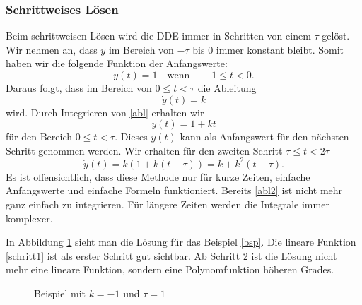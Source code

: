 \subsubsection{Schrittweises Lösen}
Beim schrittweisen Lösen wird die DDE immer in Schritten von einem $\tau$ gelöst.
Wir nehmen an, dass $y$ im Bereich von $-\tau$ bis $0$ immer konstant bleibt.
Somit haben wir die folgende Funktion der Anfangswerte:
\begin{equation}
	y(t)=1 \quad\text{wenn}\quad -1\le t<0.
\end{equation}
Daraus folgt, dass im Bereich von $0\le t<\tau$ die Ableitung
\begin{equation}\label{abl}
	\dot{y}(t)=k
\end{equation}
wird. Durch Integrieren von \eqref{abl} erhalten wir
\begin{equation}\label{schritt1}
	y(t)=1+kt
\end{equation}
für den Bereich $0\le t<\tau$. 
Dieses $y(t)$ kann als Anfangswert für den nächsten Schritt genommen werden.
Wir erhalten für den zweiten Schritt  $\tau\le t<2\tau$ 
\begin{equation}\label{abl2}
	\dot{y}(t)=k(1+k(t-\tau))=k+k^2(t-\tau).
\end{equation}
Es ist offensichtlich, dass diese Methode nur für kurze Zeiten, einfache Anfangswerte und einfache Formeln funktioniert. 
Bereits \eqref{abl2} ist nicht mehr ganz einfach zu integrieren. 
Für längere Zeiten werden die Integrale immer komplexer.

In Abbildung \ref{fig:bsp} sieht man die Lösung für das Beispiel \eqref{bsp}. 
Die lineare Funktion \eqref{schritt1} ist als erster Schritt gut sichtbar.
Ab Schritt 2 ist die Lösung nicht mehr eine lineare Funktion, sondern eine Polynomfunktion höheren Grades. 
\begin{figure}
	\centering
	
	\caption{Beispiel mit $k=-1$ und $\tau=1$}
	\label{fig:bsp}
\end{figure}

